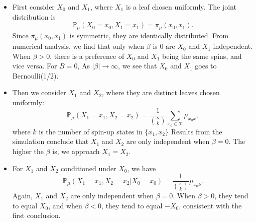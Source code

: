 \documentclass[12pt]{article}
\numberwithin{equation}{section}
\begin{document}
\begin{itemize}
    \item First consider $X_0$ and $X_1$, where $X_1$ is a leaf chosen uniformly. The joint distribution is
          \begin{equation*}
              \mathbb{P}_{\mu}(X_0=x_0, X_1=x_1) = \pi_\mu(x_0, x_1).
          \end{equation*}
          Since $\pi_\mu(x_0, x_1)$ is symmetric, they are identically distributed.
          From numerical analysis, we find that only when $\beta$ is $0$ are $X_0$ and $X_1$ independent.
          When $\beta > 0$, there is a preference of $X_0$ and $X_1$ being the same spins, and vice versa.
          For $B=0$, As $|\beta| \rightarrow \infty$, we see that $X_0$ and $X_1$ goes to Bernoulli(1/2).
    \item Then we consider $X_1$ and $X_2$, where they are distinct leaves chosen uniformly:
          \begin{equation*}
              \mathbb{P}_{\mu}(X_1=x_1, X_2=x_2) = \frac{1}{{\kappa \choose k}} \sum_{x_0\in\mathcal{X}} \mu_{x_0k} ,
          \end{equation*}
          where $k$ is the number of spin-up states in $\{x_1, x_2\}$
          Results from the simulation conclude that $X_1$ and $X_2$ are only independent when $\beta=0$. The higher the $\beta$
          is, we approach $X_1=X_2$.
    \item For $X_1$ and $X_2$ conditioned under $X_0$, we have
          \begin{equation*}
              \mathbb{P}_{\mu}(X_1=x_1, X_2=x_2 | X_0 = x_0) = \frac{1}{{\kappa \choose k}} \mu_{x_0k}.
          \end{equation*}
          Again, $X_1$ and $X_2$ are only independent when $\beta=0$. When $\beta>0$, they tend to equal $X_0$, and when $\beta<0$,
          they tend to equal $-X_0$, consistent with the first conclusion.
\end{itemize}
\end{document}
